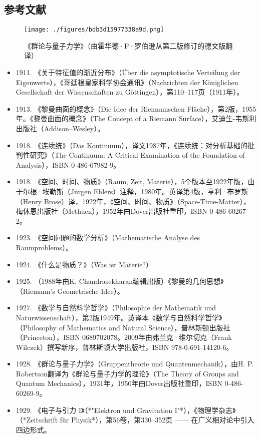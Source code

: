 \subsection{参考文献}
\begin{figure}[ht]
\centering
\texttt{[image: ./figures/bdb3d15977338a9d.png]}
\caption{《群论与量子力学》（由霍华德·P·罗伯逊从第二版修订的德文版翻译）} \label{fig_WR_3}
\end{figure}
\begin{itemize}
\item 1911. 《关于特征值的渐近分布》（Über die asymptotische Verteilung der Eigenwerte），《哥廷根皇家科学协会通讯》（Nachrichten der Königlichen Gesellschaft der Wissenschaften zu Göttingen），第110–117页（1911年）。  
\item 1913. 《黎曼曲面的概念》（Die Idee der Riemannschen Fläche），第2版，1955年。《黎曼曲面的概念》（The Concept of a Riemann Surface），艾迪生-韦斯利出版社（Addison–Wesley）。  
\item 1918. 《连续统》（Das Kontinuum），译文1987年，《连续统：对分析基础的批判性研究》（The Continuum: A Critical Examination of the Foundation of Analysis），ISBN 0-486-67982-9。  
\item 1918. 《空间、时间、物质》（Raum, Zeit, Materie），5个版本至1922年版，由于尔根·埃勒斯（Jürgen Ehlers）注释，1980年。英译第4版，亨利·布罗斯（Henry Brose）译，1922年，《空间、时间、物质》（Space-Time-Matter），梅休恩出版社（Methuen），1952年由Dover出版社重印，ISBN 0-486-60267-2。  
\item 1923. 《空间问题的数学分析》（Mathematische Analyse des Raumproblems）。  
\item 1924. 《什么是物质？》（Was ist Materie?）  
\item 1925. （1988年由K. Chandrasekharan编辑出版）《黎曼的几何思想》（Riemann's Geometrische Idee）。  
\item 1927. 《数学与自然科学哲学》（Philosophie der Mathematik und Naturwissenschaft），第2版1949年。英译本《数学与自然科学哲学》（Philosophy of Mathematics and Natural Science），普林斯顿出版社（Princeton），ISBN 0689702078。2009年由弗兰克·维尔切克（Frank Wilczek）撰写新序，普林斯顿大学出版社，ISBN 978-0-691-14120-6。  
\item 1928. 《群论与量子力学》（Gruppentheorie und Quantenmechanik），由H. P. Robertson翻译为《群论与量子力学的理论》（The Theory of Groups and Quantum Mechanics），1931年，1950年由Dover出版社重印，ISBN 0-486-60269-9。  
\item 1929. 《电子与引力 I》（*"Elektron und Gravitation I"*），《物理学杂志》（*Zeitschrift für Physik*），第56卷，第330–352页 —— 在广义相对论中引入四边形式。  

\end{itemize}
